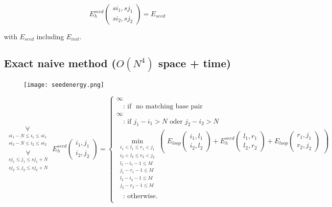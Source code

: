 \begin{equation*}
E_{h}^{seed}(\substack{si_1,sj_1\\si_2,sj_2}) = E_{seed}
\end{equation*}

with $E_{seed}$ including $E_{init}$.

\clearpage

\subsection{Exact naive method ($O(N^{4})$ space + time)}

\begin{figure}[H]
	\centering
	\texttt{[image: seedenergy.png]}
\end{figure}

\begin{equation*}
\substack{
  \underset{\substack{si_{1}-N \le i_{1} \le si_{1}\\si_{2}-N \le i_{2} \le si_{2}}}{\forall}\\
  \underset{\substack{sj_{1} \le j_{1} \le sj_{1}+N\\sj_{2} \le j_{2} \le sj_{2}+N}}{\forall}
}
E_{h}^{seed}(\substack{i_1,j_1\\i_2,j_2}) = \begin{cases}
  \infty\\
  \quad\text{: if } \text{ no matching base pair }\\
  \infty\\
  \quad\text{: if } j_{1} - i_{1} > N \text{ oder } j_{2} - i_{2} > N\\
  \min\limits_{\substack{i_{1} < l_{1} \le r_{1} < j_{1}\\i_{2} < l_{2} \le r_{2} < j_{2}\\l_{1} - i_{1} - 1 \le M\\j_{1}-r_{1}-1 \le M\\l_{2} - i_{2} - 1 \le M\\j_{2}-r_{2}-1 \le M}}
  \begin{pmatrix}
	E_{loop}(\substack{i_1,l_1\\i_2,l_2}) + E_{h}^{seed}(\substack{l_1,r_1\\l_2,r_2}) + E_{loop}(\substack{r_1,j_1\\r_2,j_2})
  \end{pmatrix}\\
  \quad\text{: otherwise.}\\
  
\end{cases}
\end{equation*}

